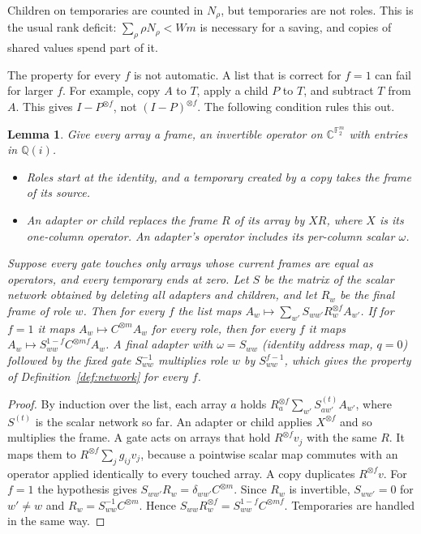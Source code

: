 \documentclass[11pt]{article}
\newtheorem{lemma}[theorem]{Lemma}
\theoremstyle{definition}
\newcommand{\F}{\mathbb F}
\begin{document}
Children on temporaries are counted in $N_\rho$, but temporaries are not roles.
This is the usual rank deficit: $\sum_\rho\rho N_\rho<Wm$ is necessary for a
saving, and copies of shared values spend part of it.

The property for every $f$ is not automatic. A list that is correct for $f=1$
can fail for larger $f$. For example, copy $A$ to $T$, apply a child $P$ to $T$,
and subtract $T$ from $A$. This gives $I-P^{\otimes f}$, not $(I-P)^{\otimes f}$.
The following condition rules this out.

\begin{lemma}\label{lem:columns}
Give every array a \emph{frame}, an invertible operator on
$\mathbb C^{\F_2^m}$ with entries in $\mathbb Q(i)$.
\begin{itemize}
\item Roles start at the identity, and a temporary created by a copy takes the
  frame of its source.
\item An adapter or child replaces the frame $R$ of its array by $XR$, where $X$
  is its one-column operator. An adapter's operator includes its per-column
  scalar $\omega$.
\end{itemize}
Suppose every gate touches only arrays whose current frames are equal as
operators, and every temporary ends at zero. Let $S$ be the matrix of the
scalar network obtained by deleting all adapters and children, and let $R_w$ be
the final frame of role $w$. Then for every $f$ the list maps
$A_w\mapsto\sum_{w'}S_{ww'}R_w^{\otimes f}A_{w'}$. If for $f=1$ it maps
$A_w\mapsto C^{\otimes m}A_w$ for every role, then for every $f$ it maps
$A_w\mapsto S_{ww}^{1-f}C^{\otimes mf}A_w$. A final adapter with $\omega=S_{ww}$
(identity address map, $q=0$) followed by the fixed gate $S_{ww}^{-1}$ multiplies
role $w$ by $S_{ww}^{f-1}$, which gives the property of
Definition~\ref{def:network} for every $f$.
\end{lemma}

\begin{proof}
By induction over the list, each array $a$ holds
$R_a^{\otimes f}\sum_{w'}S^{(t)}_{aw'}A_{w'}$, where $S^{(t)}$ is the scalar
network so far. An adapter or child applies $X^{\otimes f}$ and so multiplies the
frame. A gate acts on arrays that hold $R^{\otimes f}v_j$ with the same $R$. It
maps them to $R^{\otimes f}\sum_jg_{ij}v_j$, because a pointwise scalar map
commutes with an operator applied identically to every touched array. A copy
duplicates $R^{\otimes f}v$. For $f=1$ the hypothesis gives
$S_{ww'}R_w=\delta_{ww'}C^{\otimes m}$. Since $R_w$ is invertible, $S_{ww'}=0$ for
$w'\ne w$ and $R_w=S_{ww}^{-1}C^{\otimes m}$. Hence
$S_{ww}R_w^{\otimes f}=S_{ww}^{1-f}C^{\otimes mf}$. Temporaries are handled in the
same way.
\end{proof}
\end{document}
